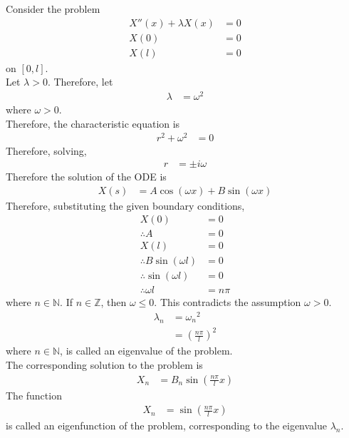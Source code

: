 \documentclass[titlepage, fleqn, a4paper, 12pt, twoside]{article}
\theoremstyle{definition}
\theoremstyle{theorem}
\begin{document}
Consider the problem
\begin{align*}
	X''(x) + \lambda X(x) & = 0 \\
	X(0)                  & = 0 \\
	X(l)                  & = 0
\end{align*}
on $[0,l]$.\\
Let $\lambda > 0$.
Therefore, let
\begin{align*}
	\lambda & = \omega^2
\end{align*}
where $\omega > 0$.\\
Therefore, the characteristic equation is
\begin{align*}
	r^2 + \omega^2 & = 0
\end{align*}
Therefore, solving,
\begin{align*}
	r & = \pm i \omega
\end{align*}
Therefore the solution of the ODE is
\begin{align*}
	X(s) & = A \cos(\omega x) + B \sin(\omega x)
\end{align*}
Therefore, substituting the given boundary conditions,
\begin{align*}
	X(0)                        & = 0 \\
	\therefore A                & = 0 \\
	X(l)                        & = 0 \\
	\therefore B \sin(\omega l) & = 0 \\
	\therefore \sin(\omega l)   & = 0 \\
	\therefore \omega l         & = n \pi
\end{align*}
where $n \in \mathbb{N}$.
\marginnote
{
	If $n \in \mathbb{Z}$, then $\omega \le 0$.
	This contradicts the assumption $\omega > 0$.
}
\begin{align*}
	\lambda_n & = {\omega_n}^2 \\
                  & = \left( \frac{n \pi}{l} \right)^2
\end{align*}
where $n \in \mathbb{N}$, is called an eigenvalue of the problem.\\
The corresponding solution to the problem is
\begin{align*}
	X_n & = B_n \sin\left( \frac{n \pi}{l} x \right)
\end{align*}
The function
\begin{align*}
	X_n & = \sin\left( \frac{n \pi}{l} x \right)
\end{align*}
is called an eigenfunction of the problem, corresponding to the eigenvalue $\lambda_n$.
\end{document}
